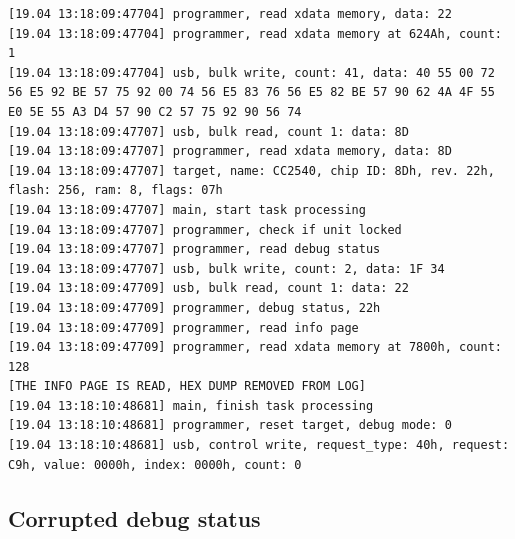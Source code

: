 \begin{verbatim}
[19.04 13:18:09:47704] programmer, read xdata memory, data: 22
[19.04 13:18:09:47704] programmer, read xdata memory at 624Ah, count: 1
[19.04 13:18:09:47704] usb, bulk write, count: 41, data: 40 55 00 72 56 E5 92 BE 57 75 92 00 74 56 E5 83 76 56 E5 82 BE 57 90 62 4A 4F 55 E0 5E 55 A3 D4 57 90 C2 57 75 92 90 56 74
[19.04 13:18:09:47707] usb, bulk read, count 1: data: 8D
[19.04 13:18:09:47707] programmer, read xdata memory, data: 8D
[19.04 13:18:09:47707] target, name: CC2540, chip ID: 8Dh, rev. 22h, flash: 256, ram: 8, flags: 07h
[19.04 13:18:09:47707] main, start task processing
[19.04 13:18:09:47707] programmer, check if unit locked
[19.04 13:18:09:47707] programmer, read debug status
[19.04 13:18:09:47707] usb, bulk write, count: 2, data: 1F 34
[19.04 13:18:09:47709] usb, bulk read, count 1: data: 22
[19.04 13:18:09:47709] programmer, debug status, 22h
[19.04 13:18:09:47709] programmer, read info page
[19.04 13:18:09:47709] programmer, read xdata memory at 7800h, count: 128
[THE INFO PAGE IS READ, HEX DUMP REMOVED FROM LOG]
[19.04 13:18:10:48681] main, finish task processing
[19.04 13:18:10:48681] programmer, reset target, debug mode: 0
[19.04 13:18:10:48681] usb, control write, request_type: 40h, request: C9h, value: 0000h, index: 0000h, count: 0
\end{verbatim}

\hypertarget{corrupted-debug-status}{%
\subsection{\texorpdfstring{Corrupted debug
status\label{appendix_corrupted_debug_status}}{Corrupted debug status}}\label{corrupted-debug-status}}

